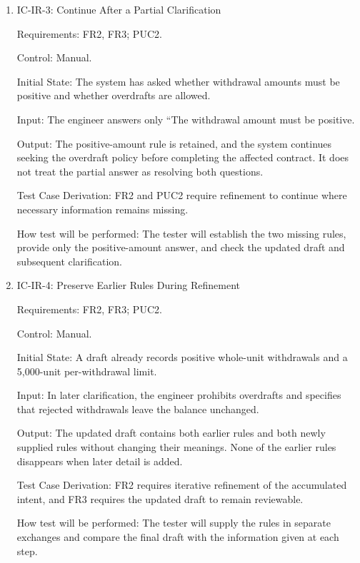 \documentclass[12pt, titlepage]{article}
\begin{document}
\begin{enumerate}
How test will be performed: The tester will request the contract, withhold the
policy, and inspect the response and any draft conditions. A clearly
incomplete draft is acceptable; an assumed policy presented as settled is not.

\item{IC-IR-3: Continue After a Partial Clarification\\}

Requirements: FR2, FR3; PUC2.

Control: Manual.

Initial State: The system has asked whether withdrawal amounts must be
positive and whether overdrafts are allowed.

Input: The engineer answers only ``The withdrawal amount must be positive.

Output: The positive-amount rule is retained, and the system continues seeking
the overdraft policy before completing the affected contract. It does not
treat the partial answer as resolving both questions.

Test Case Derivation: FR2 and PUC2 require refinement to continue where
necessary information remains missing.

How test will be performed: The tester will establish the two missing rules,
provide only the positive-amount answer, and check the updated draft and
subsequent clarification.

\item{IC-IR-4: Preserve Earlier Rules During Refinement\\}

Requirements: FR2, FR3; PUC2.

Control: Manual.

Initial State: A draft already records positive whole-unit withdrawals and a
5,000-unit per-withdrawal limit.

Input: In later clarification, the engineer prohibits overdrafts and specifies
that rejected withdrawals leave the balance unchanged.

Output: The updated draft contains both earlier rules and both newly supplied
rules without changing their meanings. None of the earlier rules disappears
when later detail is added.

Test Case Derivation: FR2 requires iterative refinement of the accumulated
intent, and FR3 requires the updated draft to remain reviewable.

How test will be performed: The tester will supply the rules in separate
exchanges and compare the final draft with the information given at each step.


\end{enumerate}
\end{document}
